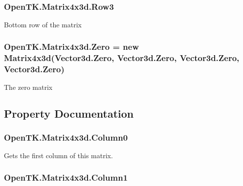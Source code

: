 \hypertarget{struct_open_t_k_1_1_matrix4x3d_a89ec663e1396246b8c5a6b13a5d58c7e}{
\subsubsection[{Row3}]{ Open\-T\-K.\-Matrix4x3d.\-Row3}}\label{struct_open_t_k_1_1_matrix4x3d_a89ec663e1396246b8c5a6b13a5d58c7e}


Bottom row of the matrix 

\hypertarget{struct_open_t_k_1_1_matrix4x3d_a3bff6f1b3685cebfc633a3b7372a692b}{
\subsubsection[{Zero}]{ Open\-T\-K.\-Matrix4x3d.\-Zero = new {\bf Matrix4x3d}(Vector3d.\-Zero, Vector3d.\-Zero, Vector3d.\-Zero, Vector3d.\-Zero)\hspace{0.3cm}{\ttfamily [static]}}}\label{struct_open_t_k_1_1_matrix4x3d_a3bff6f1b3685cebfc633a3b7372a692b}


The zero matrix 



\subsection{Property Documentation}
\hypertarget{struct_open_t_k_1_1_matrix4x3d_a61c78b9d5e1ab66caeee908e64217428}{
\subsubsection[{Column0}]{ Open\-T\-K.\-Matrix4x3d.\-Column0\hspace{0.3cm}{\ttfamily [get]}}}\label{struct_open_t_k_1_1_matrix4x3d_a61c78b9d5e1ab66caeee908e64217428}


Gets the first column of this matrix. 

\hypertarget{struct_open_t_k_1_1_matrix4x3d_a56f5879434c0066b2457bdde2202d2b8}{
\subsubsection[{Column1}]{ Open\-T\-K.\-Matrix4x3d.\-Column1\hspace{0.3cm}{\ttfamily [get]}}}\label{struct_open_t_k_1_1_matrix4x3d_a56f5879434c0066b2457bdde2202d2b8}


